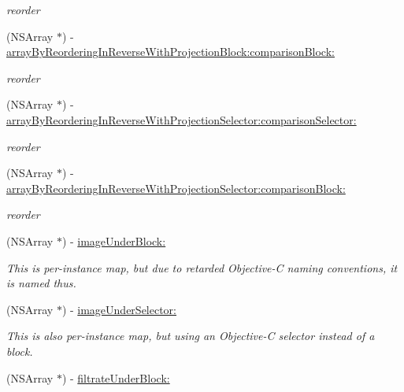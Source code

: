 \begin{DoxyCompactItemize}
\begin{DoxyCompactList}\small\item\em reorder \end{DoxyCompactList}\item 
(N\-S\-Array $\ast$) -\/ \hyperlink{interface_n_s_array_07_generics_08_a910fd7749f51410ecb1e257e0865bdce}{array\-By\-Reordering\-In\-Reverse\-With\-Projection\-Block\-:comparison\-Block\-:}
\begin{DoxyCompactList}\small\item\em reorder \end{DoxyCompactList}\item 
(N\-S\-Array $\ast$) -\/ \hyperlink{interface_n_s_array_07_generics_08_a5dbadbd0f8bdade4d0c5d3dca8ac0f89}{array\-By\-Reordering\-In\-Reverse\-With\-Projection\-Selector\-:comparison\-Selector\-:}
\begin{DoxyCompactList}\small\item\em reorder \end{DoxyCompactList}\item 
(N\-S\-Array $\ast$) -\/ \hyperlink{interface_n_s_array_07_generics_08_a450b81dcbd448782b5ba3e201b9ecfb1}{array\-By\-Reordering\-In\-Reverse\-With\-Projection\-Selector\-:comparison\-Block\-:}
\begin{DoxyCompactList}\small\item\em reorder \end{DoxyCompactList}\item 
\hypertarget{interface_n_s_array_07_generics_08_ab305c53c4c00a52431ec581ce579ee97}{(N\-S\-Array $\ast$) -\/ \hyperlink{interface_n_s_array_07_generics_08_ab305c53c4c00a52431ec581ce579ee97}{image\-Under\-Block\-:}}\label{interface_n_s_array_07_generics_08_ab305c53c4c00a52431ec581ce579ee97}

\begin{DoxyCompactList}\small\item\em This is per-\/instance map, but due to retarded Objective-\/\-C naming conventions, it is named thus. \end{DoxyCompactList}\item 
\hypertarget{interface_n_s_array_07_generics_08_a0a1b8afdae87aef30114e4699efa5be5}{(N\-S\-Array $\ast$) -\/ \hyperlink{interface_n_s_array_07_generics_08_a0a1b8afdae87aef30114e4699efa5be5}{image\-Under\-Selector\-:}}\label{interface_n_s_array_07_generics_08_a0a1b8afdae87aef30114e4699efa5be5}

\begin{DoxyCompactList}\small\item\em This is also per-\/instance map, but using an Objective-\/\-C selector instead of a block. \end{DoxyCompactList}\item 
\hypertarget{interface_n_s_array_07_generics_08_a7e050db33b094b6f1ce2011d74fb664d}{(N\-S\-Array $\ast$) -\/ \hyperlink{interface_n_s_array_07_generics_08_a7e050db33b094b6f1ce2011d74fb664d}{filtrate\-Under\-Block\-:}}\label{interface_n_s_array_07_generics_08_a7e050db33b094b6f1ce2011d74fb664d}


\end{DoxyCompactItemize}
